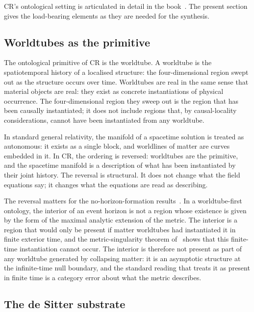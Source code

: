 \documentclass[11pt,a4paper]{article}
\theoremstyle{definition}
\begin{document}
CR's ontological setting is articulated in detail in the book~\cite{Janzen2025}. The present section gives the load-bearing elements as they are needed for the synthesis.

\subsection{Worldtubes as the primitive}\label{sec:worldtubes}

The ontological primitive of CR is the worldtube. A worldtube is the spatiotemporal history of a localised structure: the four-dimensional region swept out as the structure occurs over time. Worldtubes are real in the same sense that material objects are real: they exist as concrete instantiations of physical occurrence. The four-dimensional region they sweep out is the region that has been causally instantiated; it does not include regions that, by causal-locality considerations, cannot have been instantiated from any worldtube.

In standard general relativity, the manifold of a spacetime solution is treated as autonomous: it exists as a single block, and worldlines of matter are curves embedded in it. In CR, the ordering is reversed: worldtubes are the primitive, and the spacetime manifold is a description of what has been instantiated by their joint history. The reversal is structural. It does not change what the field equations say; it changes what the equations are read as describing.

The reversal matters for the no-horizon-formation results~\cite{JanzenBHcausality, JanzenCircle, JanzenSlicing}. In a worldtube-first ontology, the interior of an event horizon is not a region whose existence is given by the form of the maximal analytic extension of the metric. The interior is a region that would only be present if matter worldtubes had instantiated it in finite exterior time, and the metric-singularity theorem of~\cite{JanzenBHcausality} shows that this finite-time instantiation cannot occur. The interior is therefore not present as part of any worldtube generated by collapsing matter: it is an asymptotic structure at the infinite-time null boundary, and the standard reading that treats it as present in finite time is a category error about what the metric describes.

\subsection{The de Sitter substrate}\label{sec:dS-substrate}
\end{document}
